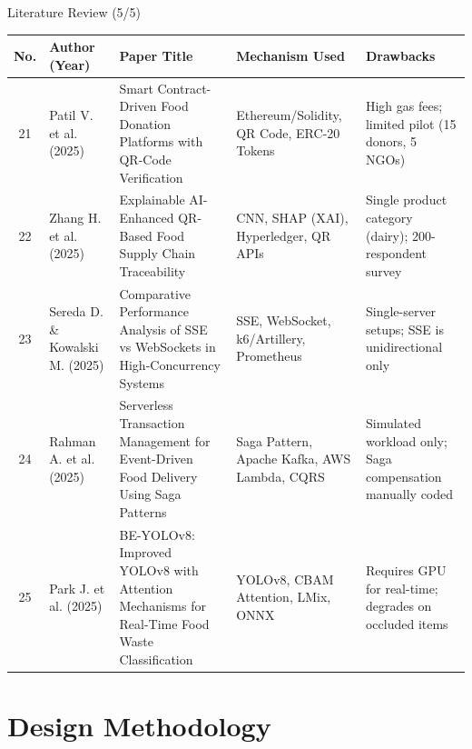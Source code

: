 \documentclass[aspectratio=169,xcolor=dvipsnames]{beamer}
\begin{document}
\begin{frame}{Literature Review (5/5)}
\scriptsize
\renewcommand{\arraystretch}{1.35}
\setlength{\tabcolsep}{3pt}

\begin{tabular}{|c|p{2.0cm}|p{3.0cm}|p{2.8cm}|p{3.0cm}|}
\hline
\textbf{No.} &
\textbf{Author (Year)} &
\textbf{Paper Title} &
\textbf{Mechanism Used} &
\textbf{Drawbacks} \\
\hline

21 &
Patil V. et al. (2025) &
Smart Contract-Driven Food Donation Platforms with QR-Code Verification &
Ethereum/Solidity, QR Code, ERC-20 Tokens &
High gas fees; limited pilot (15 donors, 5 NGOs) \\
\hline

22 &
Zhang H. et al. (2025) &
Explainable AI-Enhanced QR-Based Food Supply Chain Traceability &
CNN, SHAP (XAI), Hyperledger, QR APIs &
Single product category (dairy); 200-respondent survey \\
\hline

23 &
Sereda D. \& Kowalski M. (2025) &
Comparative Performance Analysis of SSE vs WebSockets in High-Concurrency Systems &
SSE, WebSocket, k6/Artillery, Prometheus &
Single-server setups; SSE is unidirectional only \\
\hline

24 &
Rahman A. et al. (2025) &
Serverless Transaction Management for Event-Driven Food Delivery Using Saga Patterns &
Saga Pattern, Apache Kafka, AWS Lambda, CQRS &
Simulated workload only; Saga compensation manually coded \\
\hline

25 &
Park J. et al. (2025) &
BE-YOLOv8: Improved YOLOv8 with Attention Mechanisms for Real-Time Food Waste Classification &
YOLOv8, CBAM Attention, LMix, ONNX &
Requires GPU for real-time; degrades on occluded items \\
\hline

\end{tabular}
\end{frame}



\section{Design Methodology}
\end{document}
